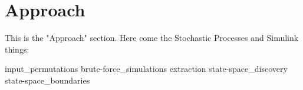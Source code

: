 \section{Approach}

This is the "Approach" section. Here come the Stochastic Processes and Simulink things:

{input_permutations}
{brute-force_simulations}
{extraction}
{state-space_discovery}
{state-space_boundaries}
